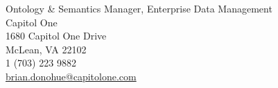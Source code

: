   {Ontology \& Semantics Manager, Enterprise Data Management
  \\ Capitol One
  \\ 1680 Capitol One Drive
  \\ McLean, VA 22102
  \\ 1 (703) 223 9882
  \\ \href{mailto:brian.donohue@capitolone.com}{brian.donohue@capitolone.com}}
